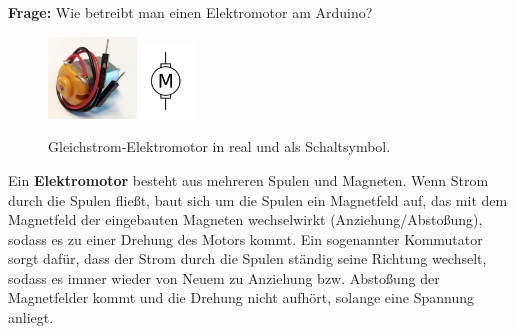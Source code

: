\begin{ziel}
	\textbf{Frage:} Wie betreibt man einen Elektromotor am Arduino?
\end{ziel}

\begin{figure}
	\centering
	\hfill
	\includegraphics[width=0.21\textwidth]{./pics/dc-motor-klein.png}
	\hfill
	\includegraphics[width=0.13\textwidth]{./Zeichnungen/motor-schaltsym.png}
	\hfill
	\caption{Gleichstrom-Elektromotor in real und als Schaltsymbol.}
\end{figure}
Ein \textbf{Elektromotor} besteht aus mehreren Spulen und Magneten. Wenn Strom durch die Spulen fließt, baut sich um die Spulen ein Magnetfeld auf, das mit dem Magnetfeld der eingebauten Magneten wechselwirkt (Anziehung/Abstoßung), sodass es zu einer Drehung des Motors kommt. Ein sogenannter Kommutator sorgt dafür, dass der Strom durch die Spulen ständig seine Richtung wechselt, sodass es immer wieder von Neuem zu Anziehung bzw. Abstoßung der Magnetfelder kommt und die Drehung nicht aufhört, solange eine Spannung anliegt.


